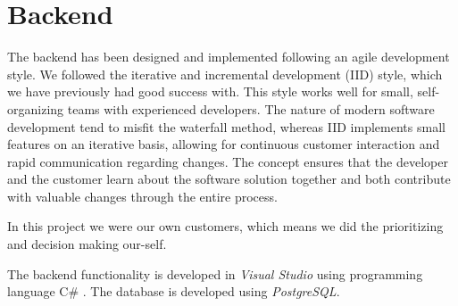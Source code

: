 \chapter{Backend}
\label{chap:backend}

The backend has been designed and implemented following an agile development style. We followed the iterative and incremental development (IID) style, which we have previously had good success with. This style works well for small, self-organizing teams with experienced developers. The nature of modern software development tend to misfit the waterfall method, whereas IID implements small features on an iterative basis, allowing for continuous customer interaction and rapid communication regarding changes. The concept ensures that the developer and the customer learn about the software solution together and both contribute with valuable changes through the entire process. 

In this project we were our own customers, which means we did the prioritizing and decision making our-self.

The backend functionality is developed in \textit{Visual Studio}\cite{visualstudio} using programming language C\# . The database is developed using \textit{PostgreSQL}\cite{postgreSQL}.





